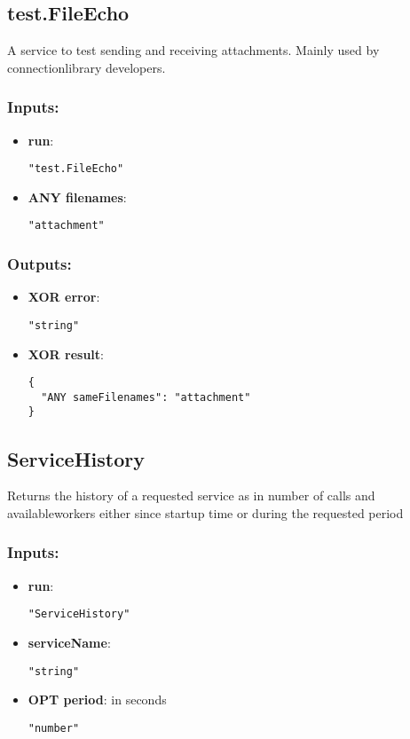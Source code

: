 \subsection{test.FileEcho}
A service to test sending and receiving attachments. Mainly used by connectionlibrary developers.
\subsubsection*{Inputs:}
\begin{itemize}
    \item \textbf{run}: 
\begin{lstlisting}
"test.FileEcho"
\end{lstlisting}
    \item \textbf{ANY filenames}: 
\begin{lstlisting}
"attachment"
\end{lstlisting}
  \end{itemize}

\subsubsection*{Outputs:}
\begin{itemize}
    \item \textbf{XOR error}: 
\begin{lstlisting}
"string"
\end{lstlisting}
    \item \textbf{XOR result}: 
\begin{lstlisting}
{
  "ANY sameFilenames": "attachment"
}
\end{lstlisting}
  \end{itemize}

\subsection{ServiceHistory}
Returns
 the history of a requested service as in number of calls and 
availableworkers either since startup time or during the requested 
period
\subsubsection*{Inputs:}
\begin{itemize}
    \item \textbf{run}: 
\begin{lstlisting}
"ServiceHistory"
\end{lstlisting}
    \item \textbf{serviceName}: 
\begin{lstlisting}
"string"
\end{lstlisting}
    \item \textbf{OPT period}: in seconds
\begin{lstlisting}
"number"
\end{lstlisting}
  \end{itemize}

